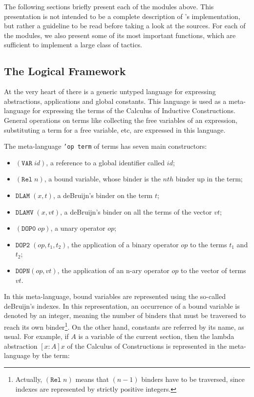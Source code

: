 \vspace{1em}

The following sections briefly present each of the modules above.
This presentation is not intended to be a complete description of \Coq's
implementation, but rather a guideline to be read before taking a look
at the sources. For each of the modules, we also present some of its
most important functions, which are sufficient to implement a large
class of tactics.


\subsection[The Logical Framework]{The Logical Framework\label{LogicalFramework}}

At the very heart of \Coq there is a generic untyped language for
expressing abstractions, applications and global constants. This
language is used as a meta-language for expressing the terms of the
Calculus of Inductive Constructions. General operations on terms like
collecting the free variables of an expression, substituting a term for
a free variable, etc, are expressed in this language.

The meta-language \texttt{'op term} of terms has seven main
constructors:
\begin{itemize}
\item $(\texttt{VAR}\;id)$, a reference to a global identifier called  $id$;
\item $(\texttt{Rel}\;n)$, a bound variable, whose binder is the $nth$
      binder up in the term;
\item $\texttt{DLAM}\;(x,t)$, a deBruijn's binder on the term $t$;
\item $\texttt{DLAMV}\;(x,vt)$, a deBruijn's binder on all the terms of 
      the vector $vt$;
\item $(\texttt{DOP0}\;op)$, a unary operator $op$;
\item $\texttt{DOP2}\;(op,t_1,t_2)$, the application of a binary
operator $op$ to the terms $t_1$ and $t_2$;
\item $\texttt{DOPN} (op,vt)$, the application of an n-ary operator $op$ to the
vector of terms $vt$.
\end{itemize}

In this meta-language, bound variables are represented using the
so-called deBruijn's indexes. In this representation, an occurrence of
a bound variable is denoted by an integer, meaning the number of
binders that must be traversed to reach its own
binder\footnote{Actually, $(\texttt{Rel}\;n)$ means that $(n-1)$ binders
have to be traversed, since indexes are represented by strictly
positive integers.}. On the other hand, constants are referred by its
name, as usual. For example, if $A$ is a variable of the current
section, then the lambda abstraction $[x:A]x$ of the Calculus of
Constructions is represented in the meta-language by the term:

